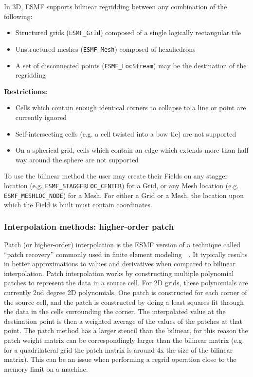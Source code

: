 \smallskip

 In 3D, ESMF supports bilinear regridding between any combination of the following:
 \begin{itemize}
 \item Structured grids ({\tt ESMF\_Grid}) composed of a single logically rectangular tile
 \item Unstructured meshes ({\tt ESMF\_Mesh}) composed of hexahedrons 
 \item A set of disconnected points ({\tt ESMF\_LocStream}) may be the destination of the regridding
 \end{itemize}

\smallskip

{\bf Restrictions:}
 \begin{itemize}
 \item Cells which contain enough identical corners to collapse to a line or point are currently ignored
 \item Self-intersecting cells (e.g. a cell twisted into a bow tie) are not supported 
 \item On a spherical grid, cells which contain an edge which extends more than half way around the sphere are not supported 
 \end{itemize}

 To use the bilinear method the user may create their Fields on any stagger location (e.g. {\tt ESMF\_STAGGERLOC\_CENTER}) for a Grid, or
 any Mesh location (e.g. {\tt ESMF\_MESHLOC\_NODE}) for a Mesh. For either a Grid or a Mesh, the location upon which the Field is built 
 must contain coordinates. 

\subsubsection{Interpolation methods: higher-order patch}\label{sec:interpolation:patch}

 Patch (or higher-order) interpolation is the ESMF version of a technique called ``patch recovery'' commonly
 used in finite element modeling~\cite{PatchInterp1}~\cite{PatchInterp2}. It typically results in better approximations to 
 values and derivatives when compared to bilinear interpolation.
 Patch interpolation works by constructing multiple polynomial patches to represent
 the data in a source cell. For 2D grids, these polynomials
 are currently 2nd degree 2D polynomials. One patch is constructed for each corner of the source cell, and the patch is constructed 
 by doing a least squares fit through the data in the cells surrounding the corner. The interpolated value at the destination point is 
 then a weighted average of the values of the patches at that point. The patch method has a larger
 stencil than the bilinear, for this reason the patch weight matrix can be correspondingly larger
 than the bilinear matrix (e.g. for a quadrilateral grid the patch matrix is around 4x the size of
 the bilinear matrix). This can be an issue when performing a regrid operation close to the memory
 limit on a machine.  

